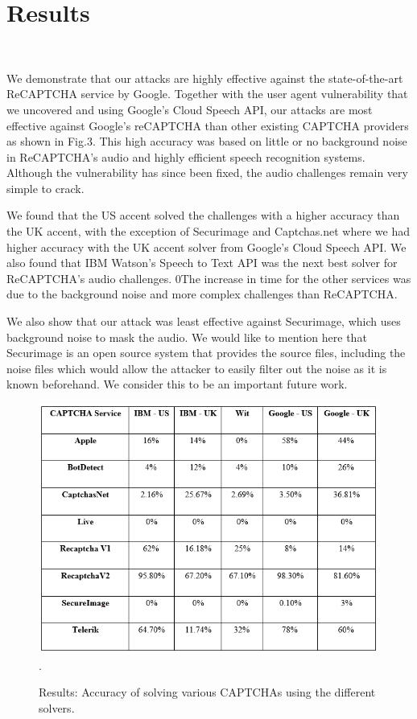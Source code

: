 \section{Results}\mbox {} \
\label{sec:results}

We demonstrate that our attacks are highly effective against the state-of-the-art ReCAPTCHA service by Google. Together with the user agent vulnerability that we uncovered and using Google's Cloud Speech API, our attacks are most effective against Google's reCAPTCHA than other existing CAPTCHA providers as shown in Fig.3. This high accuracy was based on little or no background noise in ReCAPTCHA's audio and highly efficient speech recognition systems. Although the vulnerability has since been fixed, the audio challenges remain very simple to crack.  \newline

We found that the US accent solved the challenges with a higher accuracy than the UK accent, with the exception of Securimage and Captchas.net where we had higher accuracy with the UK accent solver from Google's Cloud Speech API. We also found that IBM Watson's Speech to Text API was the next best solver for ReCAPTCHA's audio challenges. 0The increase in time for the other services was due to the background noise and more complex challenges than ReCAPTCHA.\newline

We also show that our attack was least effective against Securimage, which uses background noise to mask the audio. We would like to mention here that Securimage is an open source system that provides the source files, including the noise files which would allow the attacker to easily filter out the noise as it is known beforehand. We consider this to be an important future work.

\begin{figure}[t]
   \centering
   \includegraphics[width=\columnwidth]{figures/res1.png}.
   \caption{Results: Accuracy of solving various CAPTCHAs using the different solvers.}
   \label{fig:example}
\end{figure}
